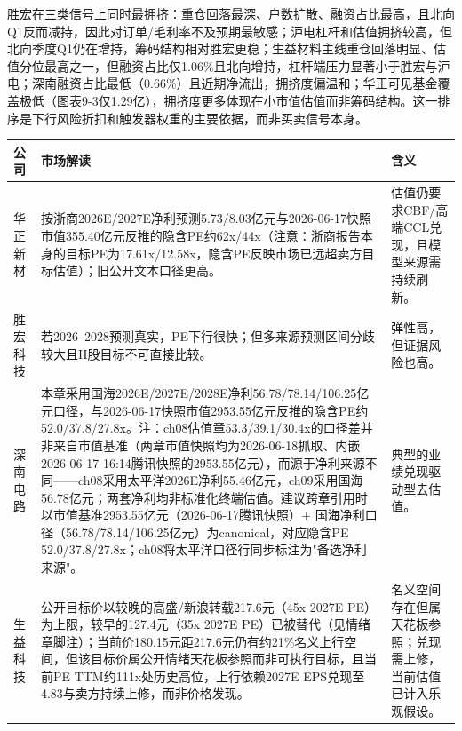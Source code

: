 胜宏在三类信号上同时最拥挤：重仓回落最深、户数扩散、融资占比最高，且北向Q1反而减持，因此对订单/毛利率不及预期最敏感；沪电杠杆和估值拥挤较高，但北向季度Q1仍在增持，筹码结构相对胜宏更稳；生益材料主线重仓回落明显、估值分位最高之一，但融资占比仅1.06\%且北向增持，杠杆端压力显著小于胜宏与沪电；深南融资占比最低（0.66\%）且近期净流出，拥挤度偏温和；华正可见基金覆盖极低（图表9-3仅1.29亿），拥挤度更多体现在小市值估值而非筹码结构。这一排序是下行风险折扣和触发器权重的主要依据，而非买卖信号本身。

\begin{dashboardbox}
\small
\begin{tabularx}{\textwidth}{L{2.5cm}X X}
\toprule
\textbf{公司} & \textbf{市场解读} & \textbf{含义} \\
\midrule
华正新材 & 按浙商2026E/2027E净利预测5.73/8.03亿元与2026-06-17快照市值355.40亿元反推的隐含PE约62x/44x（注意：浙商报告本身的目标PE为17.61x/12.58x，隐含PE反映市场已远超卖方目标估值）；旧公开文本口径更高。 & 估值仍要求CBF/高端CCL兑现，且模型来源需持续刷新。 \\
胜宏科技 & 若2026--2028预测真实，PE下行很快；但多来源预测区间分歧较大且H股目标不可直接比较。 & 弹性高，但证据风险也高。 \\
深南电路 & 本章采用国海2026E/2027E/2028E净利56.78/78.14/106.25亿元口径，与2026-06-17快照市值2953.55亿元反推的隐含PE约52.0/37.8/27.8x。注：ch08估值章53.3/39.1/30.4x的口径差并非来自市值基准（两章市值快照均为2026-06-18抓取、内嵌2026-06-17 16:14腾讯快照的2953.55亿元），而源于净利来源不同——ch08采用太平洋2026E净利55.46亿元，ch09采用国海56.78亿元；两套净利均非标准化终端估值。建议跨章引用时以市值基准2953.55亿元（2026-06-17腾讯快照）+ 国海净利口径（56.78/78.14/106.25亿元）为canonical，对应隐含PE 52.0/37.8/27.8x；ch08将太平洋口径行同步标注为"备选净利来源"。 & 典型的业绩兑现驱动型去估值。 \\
生益科技 & 公开目标价以较晚的高盛/新浪转载217.6元（45x 2027E PE）为上限，较早的127.4元（35x 2027E PE）已被替代（见情绪章脚注）；当前价180.15元距217.6元仍有约21\%名义上行空间，但该目标价属公开情绪天花板参照而非可执行目标，且当前PE TTM约111x处历史高位，上行依赖2027E EPS兑现至4.83与卖方持续上修，而非价格发现。 & 名义空间存在但属天花板参照；兑现需上修，当前估值已计入乐观假设。 \\
\bottomrule
\end{tabularx}
\end{dashboardbox}

